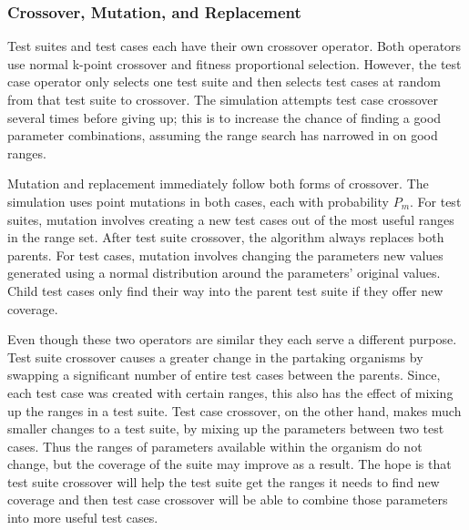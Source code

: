 \documentclass[runningheads]{llncs}
\begin{document}
\subsubsection{Crossover, Mutation, and Replacement}

Test suites and test cases each have their own crossover operator. Both operators use normal k-point crossover and fitness proportional selection. However, the test case operator only selects one test suite and then selects test cases at random from that test suite to crossover. The simulation attempts test case crossover several times before giving up; this is to increase the chance of finding a good parameter combinations, assuming the range search has narrowed in on good ranges.

Mutation and replacement immediately follow both forms of crossover. The simulation uses point mutations in both cases, each with probability $P_m$. For test suites, mutation involves creating a new test cases out of the most useful ranges in the range set. After test suite crossover, the algorithm always replaces both parents. For test cases, mutation involves changing the parameters new values generated using a normal distribution around the parameters' original values. Child test cases only find their way into the parent test suite if they offer new coverage. 

Even though these two operators are similar they each serve a different purpose. Test suite crossover causes a greater change in the partaking organisms by swapping a significant number of entire test cases between the parents. Since, each test case was created with certain ranges, this also has the effect of mixing up the ranges in a test suite. Test case crossover, on the other hand, makes much smaller changes to a test suite, by mixing up the parameters between two test cases. Thus the ranges of parameters available within the organism do not change, but the coverage of the suite may improve as a result. The hope is that test suite crossover will help the test suite get the ranges it needs to find new coverage and then test case crossover will be able to combine those parameters into more useful test cases.
\end{document}
